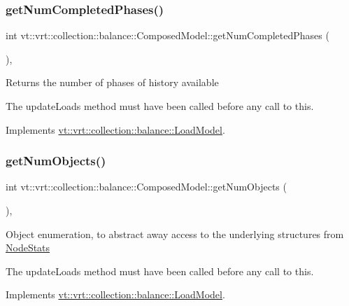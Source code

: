 \subsubsection{\texorpdfstring{get\+Num\+Completed\+Phases()}{getNumCompletedPhases()}}
{\footnotesize\ttfamily int vt\+::vrt\+::collection\+::balance\+::\+Composed\+Model\+::get\+Num\+Completed\+Phases (\begin{DoxyParamCaption}{ }\end{DoxyParamCaption})\hspace{0.3cm}{\ttfamily [override]}, {\ttfamily [virtual]}}

Returns the number of phases of history available

The {\ttfamily update\+Loads} method must have been called before any call to this. 

Implements \hyperlink{classvt_1_1vrt_1_1collection_1_1balance_1_1_load_model_adb8e89bfd2fcb625326cf8a9446d8091}{vt\+::vrt\+::collection\+::balance\+::\+Load\+Model}.

\mbox{\label{classvt_1_1vrt_1_1collection_1_1balance_1_1_composed_model_a7b383954706cb8069e841a87c3ff3f8f}} 
\subsubsection{\texorpdfstring{get\+Num\+Objects()}{getNumObjects()}}
{\footnotesize\ttfamily int vt\+::vrt\+::collection\+::balance\+::\+Composed\+Model\+::get\+Num\+Objects (\begin{DoxyParamCaption}{ }\end{DoxyParamCaption})\hspace{0.3cm}{\ttfamily [override]}, {\ttfamily [virtual]}}

Object enumeration, to abstract away access to the underlying structures from \hyperlink{structvt_1_1vrt_1_1collection_1_1balance_1_1_node_stats}{Node\+Stats}

The {\ttfamily update\+Loads} method must have been called before any call to this. 

Implements \hyperlink{classvt_1_1vrt_1_1collection_1_1balance_1_1_load_model_a87b90c2daf3a34243a7a2af266aa0b29}{vt\+::vrt\+::collection\+::balance\+::\+Load\+Model}.

